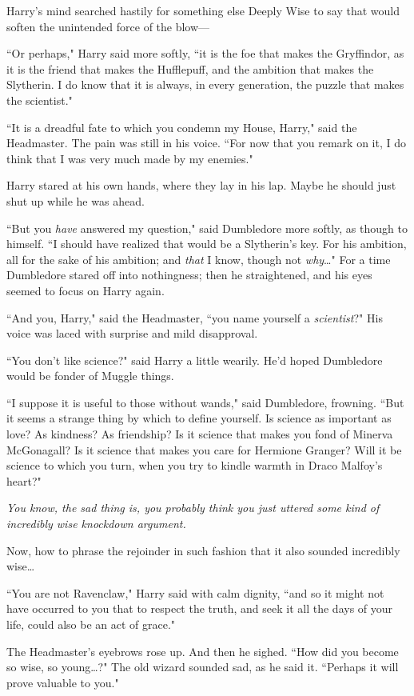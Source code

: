 Harry's mind searched hastily for something else Deeply Wise to say that would soften the unintended force of the blow—

``Or perhaps," Harry said more softly, ``it is the foe that makes the Gryffindor, as it is the friend that makes the Hufflepuff, and the ambition that makes the Slytherin. I do know that it is always, in every generation, the puzzle that makes the scientist."

``It is a dreadful fate to which you condemn my House, Harry," said the Headmaster. The pain was still in his voice. ``For now that you remark on it, I do think that I was very much made by my enemies."

Harry stared at his own hands, where they lay in his lap. Maybe he should just shut up while he was ahead.

``But you \emph{have} answered my question," said Dumbledore more softly, as though to himself. ``I should have realized that would be a Slytherin's key. For his ambition, all for the sake of his ambition; and \emph{that} I know, though not \emph{why}{\ldots}" For a time Dumbledore stared off into nothingness; then he straightened, and his eyes seemed to focus on Harry again.

``And you, Harry," said the Headmaster, ``you name yourself a \emph{scientist}?" His voice was laced with surprise and mild disapproval.

``You don't like science?" said Harry a little wearily. He'd hoped Dumbledore would be fonder of Muggle things.

``I suppose it is useful to those without wands," said Dumbledore, frowning. ``But it seems a strange thing by which to define yourself. Is science as important as love? As kindness? As friendship? Is it science that makes you fond of Minerva McGonagall? Is it science that makes you care for Hermione Granger? Will it be science to which you turn, when you try to kindle warmth in Draco Malfoy's heart?"

\emph{You know, the sad thing is, you probably think you just uttered some kind of incredibly wise knockdown argument.}

Now, how to phrase the rejoinder in such fashion that it also sounded incredibly wise{\ldots}

``You are not Ravenclaw," Harry said with calm dignity, ``and so it might not have occurred to you that to respect the truth, and seek it all the days of your life, could also be an act of grace."

The Headmaster's eyebrows rose up. And then he sighed. ``How did you become so wise, so young{\ldots}?" The old wizard sounded sad, as he said it. ``Perhaps it will prove valuable to you."

